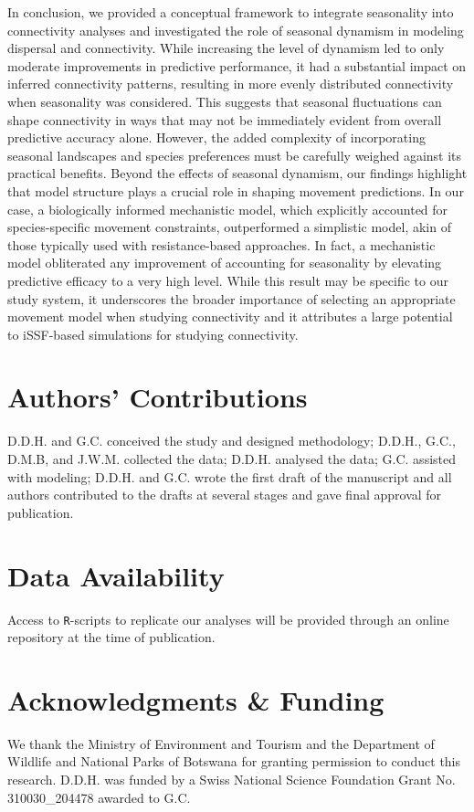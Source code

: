 \documentclass[abstract=on,10pt,a4paper,bibliography=totocnumbered]{article}
\begin{document}
In conclusion, we provided a conceptual framework to integrate seasonality into
connectivity analyses and investigated the role of seasonal dynamism in modeling
dispersal and connectivity. While increasing the level of dynamism led to only
moderate improvements in predictive performance, it had a substantial impact on
inferred connectivity patterns, resulting in more evenly distributed
connectivity when seasonality was considered. This suggests that seasonal
fluctuations can shape connectivity in ways that may not be immediately evident
from overall predictive accuracy alone. However, the added complexity of
incorporating seasonal landscapes and species preferences must be carefully
weighed against its practical benefits. Beyond the effects of seasonal dynamism,
our findings highlight that model structure plays a crucial role in shaping
movement predictions. In our case, a biologically informed mechanistic model,
which explicitly accounted for species-specific movement constraints,
outperformed a simplistic model, akin of those typically used with
resistance-based approaches. In fact, a mechanistic model obliterated any
improvement of accounting for seasonality by elevating predictive efficacy to a
very high level. While this result may be specific to our study system, it
underscores the broader importance of selecting an appropriate movement model
when studying connectivity and it attributes a large potential to iSSF-based
simulations for studying connectivity.

\section{Authors' Contributions}

D.D.H. and G.C. conceived the study and designed methodology; D.D.H., G.C.,
D.M.B, and J.W.M. collected the data; D.D.H. analysed the data; G.C. assisted
with modeling; D.D.H. and G.C. wrote the first draft of the manuscript and all
authors contributed to the drafts at several stages and gave final approval for
publication.

\section{Data Availability}

Access to \texttt{R}-scripts to replicate our analyses will be provided through
an online repository at the time of publication.

\section{Acknowledgments \& Funding}

We thank the Ministry of Environment and Tourism and the Department of Wildlife
and National Parks of Botswana for granting permission to conduct this
research. D.D.H. was funded by a Swiss National Science Foundation Grant No.
310030\_204478 awarded to G.C.

\newpage
\begingroup
\singlespacing
{}
\endgroup
\end{document}
